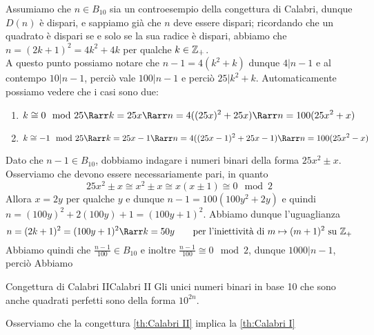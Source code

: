 \documentclass[openany]{book}
\begin{document}
Assumiamo che $n \in B_{10}$ sia un controesempio della congettura di Calabri, dunque $D(n)$ è dispari, e sappiamo già che $n$ deve essere dispari; ricordando che un quadrato è dispari se e solo se la sua radice è dispari, abbiamo che $n = (2k+1)^2 = 4k^2 + 4k$ per qualche $k \in \mathbb{Z}_+$.\\
A questo punto possiamo notare che $n-1 = 4(k^2 + k)$ dunque $4|n-1$ e al contempo $10| n-1$, perciò vale $100|n-1$ e perciò $25 | k^2 + k$. Automaticamente possiamo vedere che i casi sono due:
\begin{enumerate}
    \item \[ k \cong 0 \mod 25  \Rarr k = 25x \Rarr n = 4((25x)^2 + 25x) \Rarr n = 100(25x^2 + x )\]
    \item \[ k \cong -1 \mod 25 \Rarr k = 25x-1 \Rarr n = 4((25x-1)^2 + 25x - 1) \Rarr n = 100(25x^2 - x) \]
\end{enumerate}

Dato che $n-1 \in B_{10}$, dobbiamo indagare i numeri binari della forma $25x^2 \pm x$. Osserviamo che devono essere necessariamente pari, in quanto
\[ 25x^2 \pm x \cong x^2 \pm x \cong x(x \pm 1) \cong 0 \mod 2 \]
Allora $x = 2y$ per qualche $y$ e dunque $n-1 = 100(100y^2 + 2y)$ e quindi $n = (100y)^2 + 2(100y) + 1 = (100y +1)^2$. Abbiamo dunque l'uguaglianza
\[ n = (2k+1)^2 = (100y + 1)^2 \Rarr k = 50y \qquad \text{per l'iniettività di } m \mapsto (m+1)^2 \text{ su } \Z_+\] 
Abbiamo quindi che $\frac{n-1}{100} \in B_{10}$ e inoltre $\frac{n-1}{100} \cong 0 \mod 2$, dunque 
$1000|n-1$, perciò Abbiamo

\begin{theorem}{Congettura di Calabri II}{Calabri II}
    Gli unici numeri binari in base 10 che sono anche quadrati perfetti sono della forma $10^{2n}$.
\end{theorem}
Osserviamo che la congettura \ref{th:Calabri II} implica la \ref{th:Calabri I}
\end{document}
